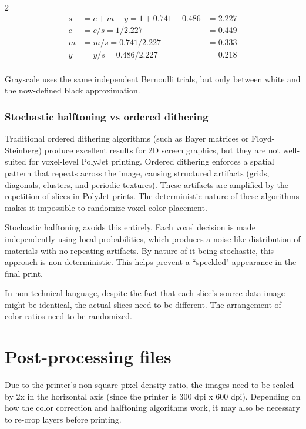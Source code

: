 \documentclass{article}
\begin{document}
\begin{multicols}{2}
\[
\begin{aligned}
s &= c + m + y =1 + 0.741 + 0.486 &= 2.227 \\
c &= {c}/{s}   = {1}/{2.227} &= 0.449 \\
m &= {m}/{s}   = {0.741}/{2.227} &= 0.333\\
y &= {y}/{s}   = {0.486}/{2.227} &= 0.218 \\
\end{aligned}
\]

Grayscale uses the same independent Bernoulli trials, but only between white and the now-defined black approximation.

\subsubsection{Stochastic halftoning vs ordered dithering}

Traditional ordered dithering algorithms (such as Bayer matrices or Floyd-Steinberg) produce excellent results for 2D screen graphics, but they are not well-suited for voxel-level PolyJet printing. Ordered dithering enforces a spatial pattern that repeats across the image, causing structured artifacts (grids, diagonals, clusters, and periodic textures). These artifacts are amplified by the repetition of slices in PolyJet prints. The deterministic nature of these algorithms makes it impossible to randomize voxel color placement.

Stochastic halftoning avoids this entirely. Each voxel decision is made independently using local probabilities, which produces a noise-like distribution of materials with no repeating artifacts. By nature of it being stochastic, this approach is non-deterministic. This helps prevent a ``speckled" appearance in the final print.

In non-technical language, despite the fact that each slice's source data image might be identical, the actual slices need to be different. The arrangement of color ratios need to be randomized. 

\section{Post-processing files}

Due to the printer's non-square pixel density ratio, the images need to be scaled by 2x in the horizontal axis (since the printer is 300 dpi x 600 dpi). Depending on how the color correction and halftoning algorithms work, it may also be necessary to re-crop layers before printing.


\end{multicols}
\end{document}

